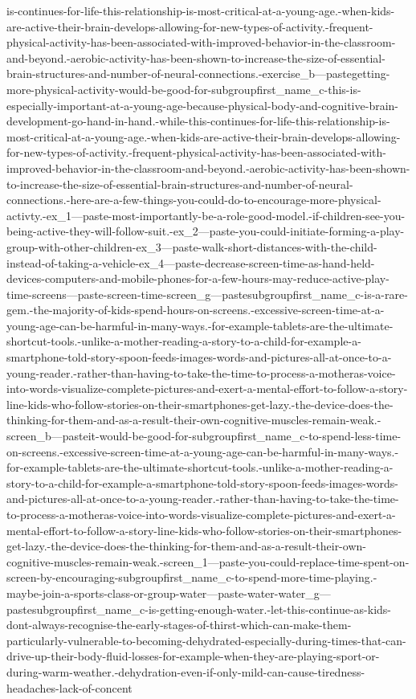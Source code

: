 \documentclass[]{article}
\begin{document}
is-continues-for-life-this-relationship-is-most-critical-at-a-young-age.-when-kids-are-active-their-brain-develops-allowing-for-new-types-of-activity.-frequent-physical-activity-has-been-associated-with-improved-behavior-in-the-classroom-and-beyond.-aerobic-activity-has-been-shown-to-increase-the-size-of-essential-brain-structures-and-number-of-neural-connections.-exercise_b---pastegetting-more-physical-activity-would-be-good-for-subgroupfirst_name_c-this-is-especially-important-at-a-young-age-because-physical-body-and-cognitive-brain-development-go-hand-in-hand.-while-this-continues-for-life-this-relationship-is-most-critical-at-a-young-age.-when-kids-are-active-their-brain-develops-allowing-for-new-types-of-activity.-frequent-physical-activity-has-been-associated-with-improved-behavior-in-the-classroom-and-beyond.-aerobic-activity-has-been-shown-to-increase-the-size-of-essential-brain-structures-and-number-of-neural-connections.-here-are-a-few-things-you-could-do-to-encourage-more-physical-activty.-ex_1---paste-most-importantly-be-a-role-good-model.-if-children-see-you-being-active-they-will-follow-suit.-ex_2---paste-you-could-initiate-forming-a-play-group-with-other-children-ex_3---paste-walk-short-distances-with-the-child-instead-of-taking-a-vehicle-ex_4---paste-decrease-screen-time-as-hand-held-devices-computers-and-mobile-phones-for-a-few-hours-may-reduce-active-play-time-screens---paste-screen-time-screen_g---pastesubgroupfirst_name_c-is-a-rare-gem.-the-majority-of-kids-spend-hours-on-screens.-excessive-screen-time-at-a-young-age-can-be-harmful-in-many-ways.-for-example-tablets-are-the-ultimate-shortcut-tools.-unlike-a-mother-reading-a-story-to-a-child-for-example-a-smartphone-told-story-spoon-feeds-images-words-and-pictures-all-at-once-to-a-young-reader.-rather-than-having-to-take-the-time-to-process-a-motheras-voice-into-words-visualize-complete-pictures-and-exert-a-mental-effort-to-follow-a-story-line-kids-who-follow-stories-on-their-smartphones-get-lazy.-the-device-does-the-thinking-for-them-and-as-a-result-their-own-cognitive-muscles-remain-weak.-screen_b---pasteit-would-be-good-for-subgroupfirst_name_c-to-spend-less-time-on-screens.-excessive-screen-time-at-a-young-age-can-be-harmful-in-many-ways.-for-example-tablets-are-the-ultimate-shortcut-tools.-unlike-a-mother-reading-a-story-to-a-child-for-example-a-smartphone-told-story-spoon-feeds-images-words-and-pictures-all-at-once-to-a-young-reader.-rather-than-having-to-take-the-time-to-process-a-motheras-voice-into-words-visualize-complete-pictures-and-exert-a-mental-effort-to-follow-a-story-line-kids-who-follow-stories-on-their-smartphones-get-lazy.-the-device-does-the-thinking-for-them-and-as-a-result-their-own-cognitive-muscles-remain-weak.-screen_1---paste-you-could-replace-time-spent-on-screen-by-encouraging-subgroupfirst_name_c-to-spend-more-time-playing.-maybe-join-a-sports-class-or-group-water---paste-water-water_g---pastesubgroupfirst_name_c-is-getting-enough-water.-let-this-continue-as-kids-dont-always-recognise-the-early-stages-of-thirst-which-can-make-them-particularly-vulnerable-to-becoming-dehydrated-especially-during-times-that-can-drive-up-their-body-fluid-losses-for-example-when-they-are-playing-sport-or-during-warm-weather.-dehydration-even-if-only-mild-can-cause-tiredness-headaches-lack-of-concent
\end{document}
